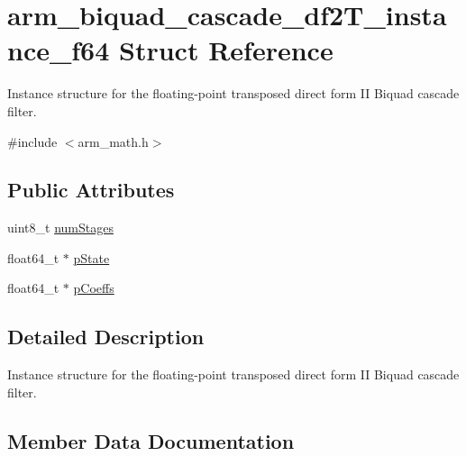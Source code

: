 \hypertarget{structarm__biquad__cascade__df2_t__instance__f64}{}\section{arm\+\_\+biquad\+\_\+cascade\+\_\+df2\+T\+\_\+instance\+\_\+f64 Struct Reference}
\label{structarm__biquad__cascade__df2_t__instance__f64}


Instance structure for the floating-\/point transposed direct form II Biquad cascade filter.  




{\ttfamily \#include $<$arm\+\_\+math.\+h$>$}

\subsection*{Public Attributes}
\begin{DoxyCompactItemize}
\item 
uint8\+\_\+t \hyperlink{structarm__biquad__cascade__df2_t__instance__f64_ad55380ff835b533aa5168f836db8a4de}{num\+Stages}
\item 
float64\+\_\+t $\ast$ \hyperlink{structarm__biquad__cascade__df2_t__instance__f64_a0bde57b618e3f9059b23b0de64e12ce3}{p\+State}
\item 
float64\+\_\+t $\ast$ \hyperlink{structarm__biquad__cascade__df2_t__instance__f64_ae2f0180f9038c0393e1d6921bb3b878b}{p\+Coeffs}
\end{DoxyCompactItemize}


\subsection{Detailed Description}
Instance structure for the floating-\/point transposed direct form II Biquad cascade filter. 

\subsection{Member Data Documentation}
